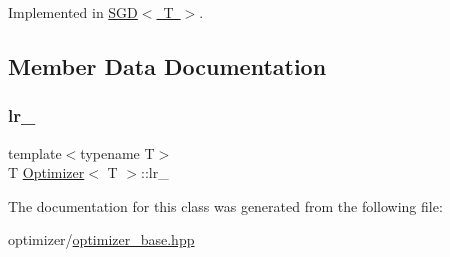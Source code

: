 Implemented in \mbox{\hyperlink{class_s_g_d_a0345cfa977a251c576096ea6a098230f}{S\+G\+D$<$ T $>$}}.



\subsection{Member Data Documentation}
\mbox{\label{class_optimizer_ae2c08a5735271a04c417dc616496fba2}} 
\subsubsection{\texorpdfstring{lr\_}{lr\_}}
{\footnotesize\ttfamily template$<$typename T$>$ \\
T \mbox{\hyperlink{class_optimizer}{Optimizer}}$<$ T $>$\+::lr\+\_\+\hspace{0.3cm}{\ttfamily [protected]}}



The documentation for this class was generated from the following file\+:\begin{DoxyCompactItemize}
\item 
optimizer/\mbox{\hyperlink{optimizer__base_8hpp}{optimizer\+\_\+base.\+hpp}}\end{DoxyCompactItemize}
